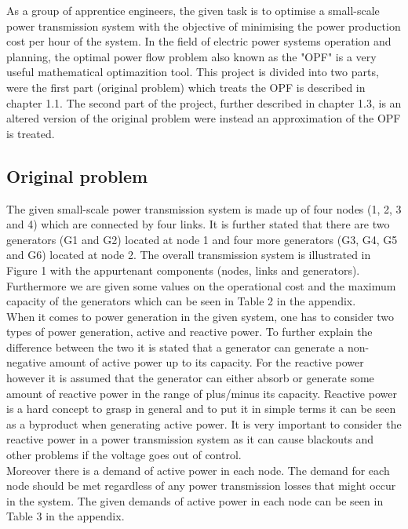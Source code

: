 
As a group of apprentice engineers, the given task is to optimise a small-scale power transmission system with the objective of minimising the power production cost per hour of the system. In the field of electric power systems operation and planning, the optimal power flow problem also known as the "OPF" is a very useful mathematical optimazition tool. This project is divided into two parts, were the first part (original problem) which treats the OPF is described in chapter 1.1. The second part of the project, further described in chapter 1.3, is an altered version of the original problem were instead an approximation of the OPF is treated.

\subsection{Original problem}
The given small-scale power transmission system is made up of four nodes (1, 2, 3 and 4) which are connected by four links. It is further stated that there are two generators (G1 and G2) located at node 1 and four more generators (G3, G4, G5 and G6) located at node 2. The overall transmission system is illustrated in Figure 1 with the appurtenant components (nodes, links and generators). \\



Furthermore we are given some values on the operational cost and the maximum capacity of the generators which can be seen in Table 2 in the appendix. \\

When it comes to power generation in the given system, one has to consider two types of power generation, active and reactive power. To further explain the difference between the two it is stated that a generator can generate a non-negative amount of active power up to its capacity. For the reactive power however it is assumed that the generator can either absorb or generate some amount of reactive power in the range of plus/minus its capacity. Reactive power is a hard concept to grasp in general and to put it in simple terms it can be seen as a byproduct when generating active power. It is very important to consider the reactive power in a power transmission system as it can cause blackouts and other problems if the voltage goes out of control.  \\

Moreover there is a demand of active power in each node. The demand for each node should be met regardless of any power transmission losses that might occur in the system. The given demands of active power in each node can be seen in Table 3 in the appendix. \\

